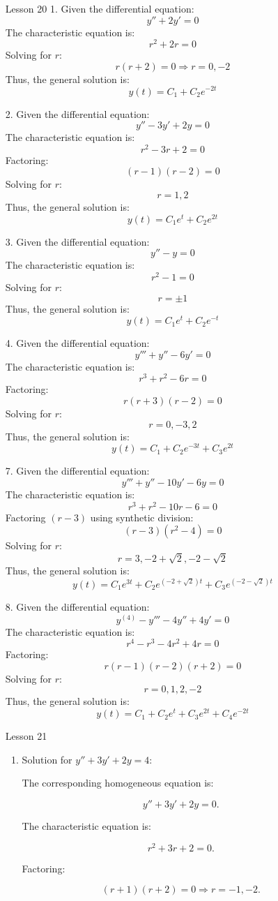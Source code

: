 \documentclass[12pt]{article}
\begin{document}
\begin{enumerate}
\item [Lesson 20]
1. Given the differential equation:
\[
y'' + 2y' = 0
\]
The characteristic equation is:
\[
r^2 + 2r = 0
\]
Solving for \( r \):
\[
r(r + 2) = 0 \Rightarrow r = 0, -2
\]
Thus, the general solution is:
\[
y(t) = C_1 + C_2 e^{-2t}
\]

2. Given the differential equation:
\[
y'' - 3y' + 2y = 0
\]
The characteristic equation is:
\[
r^2 - 3r + 2 = 0
\]
Factoring:
\[
(r - 1)(r - 2) = 0
\]
Solving for \( r \):
\[
r = 1, 2
\]
Thus, the general solution is:
\[
y(t) = C_1 e^t + C_2 e^{2t}
\]

3. Given the differential equation:
\[
y'' - y = 0
\]
The characteristic equation is:
\[
r^2 - 1 = 0
\]
Solving for \( r \):
\[
r = \pm1
\]
Thus, the general solution is:
\[
y(t) = C_1 e^t + C_2 e^{-t}
\]

4. Given the differential equation:
\[
y''' + y'' - 6y' = 0
\]
The characteristic equation is:
\[
r^3 + r^2 - 6r = 0
\]
Factoring:
\[
r(r + 3)(r - 2) = 0
\]
Solving for \( r \):
\[
r = 0, -3, 2
\]
Thus, the general solution is:
\[
y(t) = C_1 + C_2 e^{-3t} + C_3 e^{2t}
\]

7. Given the differential equation:
\[
y''' + y'' - 10y' - 6y = 0
\]
The characteristic equation is:
\[
r^3 + r^2 - 10r - 6 = 0
\]
Factoring \( (r - 3) \) using synthetic division:
\[
(r - 3)(r^2 - 4) = 0
\]
Solving for \( r \):
\[
r = 3, -2 + \sqrt{2}, -2 - \sqrt{2}
\]
Thus, the general solution is:
\[
y(t) = C_1 e^{3t} + C_2 e^{(-2+\sqrt{2})t} + C_3 e^{(-2-\sqrt{2})t}
\]

8. Given the differential equation:
\[
y^{(4)} - y''' - 4y'' + 4y' = 0
\]
The characteristic equation is:
\[
r^4 - r^3 - 4r^2 + 4r = 0
\]
Factoring:
\[
r(r - 1)(r - 2)(r + 2) = 0
\]
Solving for \( r \):
\[
r = 0, 1, 2, -2
\]
Thus, the general solution is:
\[
y(t) = C_1 + C_2 e^t + C_3 e^{2t} + C_4 e^{-2t}
\]

\item [Lesson 21]
\begin{enumerate}
    \item Solution for  \( y'' + 3y' + 2y = 4 \):

    The corresponding homogeneous equation is:

    \[
    y'' + 3y' + 2y = 0.
    \]

    The characteristic equation is:

    \[
    r^2 + 3r + 2 = 0.
    \]

    Factoring:

    \[
    (r+1)(r+2) = 0 \Rightarrow r = -1, -2.
    \]


\end{enumerate}
\end{enumerate}
\end{document}
